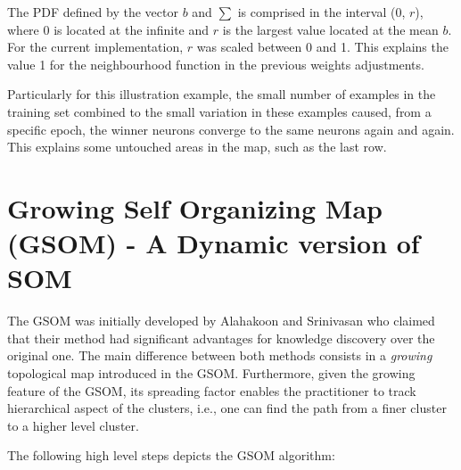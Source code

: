 \vspace{0.2cm}

The PDF defined by the vector $b$ and $\sum$ is comprised in the interval ($0$, $r$), where $0$ is located at the infinite and $r$ is the largest value located at the mean $b$. For the current implementation, $r$ was scaled between 0 and 1. This explains the value 1 for the neighbourhood function in the previous weights adjustments.

Particularly for this illustration example, the small number of examples in the training set combined to the small variation in these examples caused, from a specific epoch, the winner neurons converge to the same neurons again and again. This explains some untouched areas in the map, such as the last row. 






\section{Growing Self Organizing Map (GSOM) - A Dynamic version of SOM}

The GSOM was initially developed by Alahakoon and Srinivasan \cite{Alahakoon:2000} who claimed that their method had significant advantages for knowledge discovery over the original one. The main difference between both methods consists in a \textit{growing} topological map introduced in the GSOM. Furthermore, given the growing feature of the GSOM, its spreading factor enables the practitioner to track hierarchical aspect of the clusters, i.e., one can find the path from a finer cluster to a higher level cluster.  

The following high level steps depicts the GSOM algorithm:

